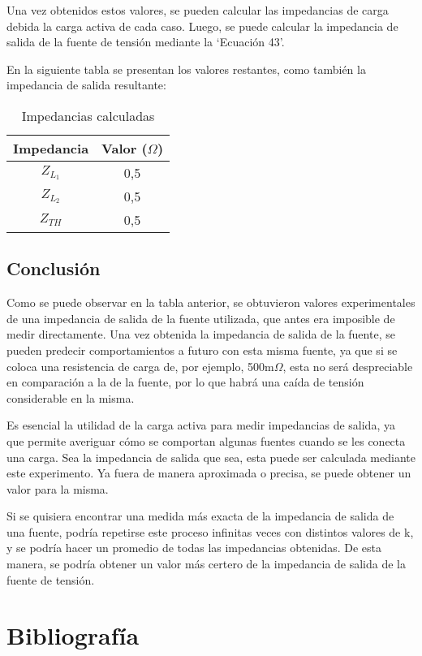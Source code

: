 \documentclass[12pt,oneside,a4paper]{article}
\begin{document}
Una vez obtenidos estos valores, se pueden calcular las impedancias de carga debida la carga activa de 
cada caso. Luego, se puede calcular la impedancia de salida de la fuente de tensión mediante la 
\enquote*{Ecuación 43}.

En la siguiente tabla se presentan los valores restantes, como también la impedancia de salida resultante:

\begin{table}[H]
    \centering
    \begin{tabular}{|c|c|}
        \hline
        \rowcolor[HTML]{C0C0C0} 
        \hline
        \textbf{Impedancia} & \textbf{Valor ($\Omega$)} \\ \hline
        \textbf{$Z_{L_1}$}         & 0,5             \\ \hline
        \textbf{$Z_{L_2}$}         & 0,5             \\ \hline
        \textbf{$Z_{TH}$}          & 0,5             \\ \hline
    \end{tabular}
    \caption{Impedancias calculadas}
\end{table}

\subsection*{Conclusión}

Como se puede observar en la tabla anterior, se obtuvieron valores experimentales de una impedancia de 
salida de la fuente utilizada, que antes era imposible de medir directamente. Una vez obtenida la 
impedancia de salida de la fuente, se pueden predecir comportamientos a futuro con esta misma fuente, ya 
que si se coloca una resistencia de carga de, por ejemplo, 500m$\Omega$, esta no será despreciable 
en comparación a la de la fuente, por lo que habrá una caída de tensión considerable en la misma.

Es esencial la utilidad de la carga activa para medir impedancias de salida, ya que permite 
averiguar cómo se comportan algunas fuentes cuando se les conecta una carga. Sea la impedancia 
de salida que sea, esta puede ser calculada mediante este experimento. Ya fuera de manera 
aproximada o precisa, se puede obtener un valor para la misma. 

Si se quisiera encontrar una medida más exacta de la impedancia de salida de una fuente, podría 
repetirse este proceso infinitas veces con distintos valores de k, y se podría hacer un promedio 
de todas las impedancias obtenidas. De esta manera, se podría obtener un valor más certero de la 
impedancia de salida de la fuente de tensión.


\newpage

\section{Bibliografía}

\nocite{*}
    \printbibliography
\end{document}
